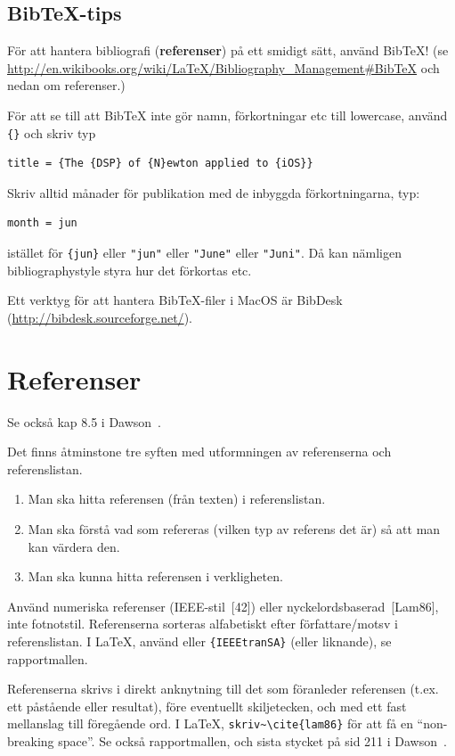 \documentclass[swedish, a4paper,12pt]{article}
\begin{document}
\subsection{Bib\TeX-tips}

För att hantera bibliografi (\textbf{referenser}) på ett smidigt sätt, använd BibTeX! (se \url{http://en.wikibooks.org/wiki/LaTeX/Bibliography_Management#BibTeX} och nedan om referenser.)

För att se till att BibTeX inte gör namn, förkortningar etc till lowercase, använd \verb|{}| och skriv typ
\begin{verbatim}
title = {The {DSP} of {N}ewton applied to {iOS}}
\end{verbatim}

Skriv alltid månader för publikation med de inbyggda förkortningarna, typ:
\begin{verbatim}
month = jun
\end{verbatim}
istället för \verb|{jun}| eller \verb|"jun"| eller \verb|"June"| eller \verb|"Juni"|. Då kan nämligen bibliographystyle styra hur det förkortas etc.

Ett verktyg för att hantera BibTeX-filer i MacOS är BibDesk (\url{http://bibdesk.sourceforge.net/}).


\section{Referenser}
\label{sec:referenser}

Se också kap 8.5 i Dawson~\cite{dawson:projects-in-computing}.

Det finns åtminstone tre syften med utformningen av referenserna och referenslistan.
\begin{enumerate}
\item Man ska hitta referensen (från texten) i referenslistan.
\item Man ska förstå vad som refereras (vilken typ av referens det är) så att man kan värdera den.
\item Man ska kunna hitta referensen i verkligheten.
\end{enumerate}

Använd numeriska referenser (IEEE-stil~[42]) eller nyckelordsbaserad~[Lam86], inte fotnotstil. Referenserna sorteras alfabetiskt efter författare/motsv i referenslistan. I LaTeX, använd \verb|| eller \verb|{IEEEtranSA}| (eller liknande), se rapportmallen.

Referenserna skrivs i direkt anknytning till det som föranleder referensen (t.ex. ett påstående eller resultat), före eventuellt skiljetecken, och med ett fast mellanslag till föregående ord. I LaTeX, \verb|skriv~\cite{lam86}| för att få en ``non-breaking space''. Se också rapportmallen, och sista stycket på sid 211 i Dawson~\cite{dawson:projects-in-computing}.
\end{document}

